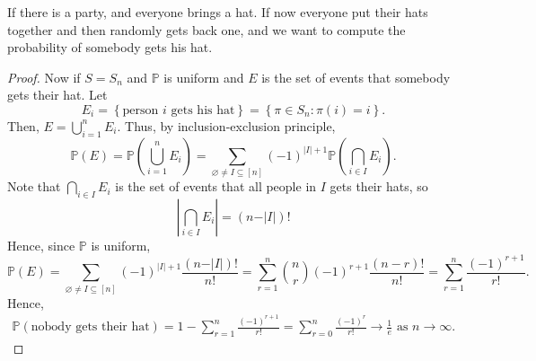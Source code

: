 \begin{eg}
    If there is a party, and everyone brings a hat. If now everyone put their hats together and then randomly gets back one, and we want to compute the probability of somebody gets his hat. 
\end{eg}
\begin{proof}
    Now if \(S = S_n\) and \(\mathbb{P} \) is uniform and \(E\) is the set of events that somebody gets their hat. Let 
    \[
        E_i = \left\{ \text{person } i \text{ gets his hat}   \right\} = \left\{ \pi \in S_n: \pi (i) = i \right\}.  
    \]
    Then, \(E = \bigcup_{i=1}^{n} E_i \). Thus, by inclusion-exclusion principle, 
    \[
        \mathbb{P} (E) = \mathbb{P} \left( \bigcup_{i=1}^{n} E_i  \right) = \sum_{\varnothing \neq I \subseteq [n]} (-1)^{\vert I \vert + 1} \mathbb{P} \left( \bigcap_{i \in I} E_i  \right).  
    \] 
    Note that \(\bigcap_{i \in I} E_i \) is the set of events that all people in \(I\) gets their hats, so 
    \[
        \left\vert \bigcap_{i \in I} E_i  \right\vert = (n - \vert I \vert )!
    \]  
    Hence, since \(\mathbb{P} \) is uniform, 
    \[
        \mathbb{P} (E) = \sum_{\varnothing \neq I \subseteq [n]}(-1)^{\vert I \vert + 1} \frac{(n - \vert I \vert )!}{n!} = \sum_{r=1}^n \binom{n}{r} (-1)^{r+1} \frac{(n-r)!}{n!} = \sum_{r=1}^n \frac{(-1)^{r+1}}{r!} .  
    \] 
    Hence,
    \begin{align*}
        \mathbb{P} \left( \text{nobody gets their hat}  \right) = 1 - \sum_{r=1}^n \frac{(-1)^{r+1}}{r!} = \sum_{r=0}^n \frac{(-1)^r}{r!} \to \frac{1}{e} \text{ as } n \to \infty .    
    \end{align*}
\end{proof}
